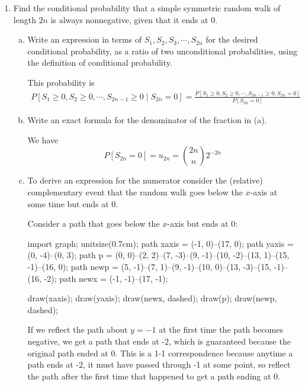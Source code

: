 \documentclass{article}
\begin{document}
\begin{enumerate}[(1)]
\begin{enumerate}[(a)]
		\end{enumerate}

		\newpage
	\item Find the conditional probability that a simple symmetric random walk of length $2n$ is always nonnegative, given that it ends at 0.

		\begin{enumerate}[(a)]
			\item Write an expression in terms of $S_1, S_2, S_3, \cdots, S_{2n}$ for the desired conditional probability, as a ratio of two unconditional probabilities, using the definition of conditional probability.
				\begin{soln}
					This probability is
					\begin{align*}
						P[S_1\ge0, S_2\ge0, \cdots, S_{2n-1}\ge0\mid S_{2n}=0] = \frac{P[S_1\ge0, S_2\ge0, \cdots, S_{2n-1}\ge0, S_{2n}=0]}{P[S_{2n}=0]}
					\end{align*}
				\end{soln}

			\item Write an exact formula for the denominator of the fraction in (a).
				\begin{soln}
					We have
					\[P[S_{2n}=0]=u_{2n}=\binom{2n}{n}2^{-2n}\]
				\end{soln}

			\item To derive an expression for the numerator consider the (relative) complementary event that the random walk goes below the $x$-axis at some time but ends at 0.
				\begin{soln}
					Consider a path that goes below the $x$-axis but ends at 0:
					\begin{center}
						\begin{asy}
							import graph;
							unitsize(0.7cm);
							path xaxis = (-1, 0)--(17, 0);
							path yaxis = (0, -4)--(0, 3);
							path p = (0, 0)--(2, 2)--(7, -3)--(9, -1)--(10, -2)--(13, 1)--(15, -1)--(16, 0);
							path newp = (5, -1)--(7, 1)--(9, -1)--(10, 0)--(13, -3)--(15, -1)--(16, -2);
							path newx = (-1, -1)--(17, -1);

							draw(xaxis);
							draw(yaxis);
							draw(newx, dashed);
							draw(p);
							draw(newp, dashed);
						\end{asy}
					\end{center}
					If we reflect the path about $y=-1$ at the first time the path becomes negative, we get a path that ends at -2, which is guaranteed because the original path ended at 0. This is a 1-1 correspondence because anytime a path ends at -2, it must have passed through -1 at some point, so reflect the path after the first time that happened to get a path ending at 0.
				\end{soln}


\end{enumerate}
\end{enumerate}
\end{document}
